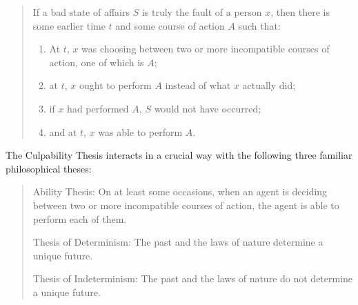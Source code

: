 \vspace{-1em}

\begin{quote}
If a bad state of affairs $S$ is truly the fault of a person $x$, then there
is some earlier time $t$ and some course of action $A$ such that: 
\begin{enumerate}
\def\labelenumi{(\arabic{enumi})}
\setcounter{enumi}{0}
\item
  At $t$, $x$ was choosing between two or more incompatible courses of action, one
of which is $A$; 
\item 
  at $t$, $x$ ought to perform $A$ instead of what $x$ actually
did;
\item 
    if $x$ had performed $A$, $S$ would not have occurred;
\item 
    and at $t$, $x$ was able to perform $A$.

    
\end{enumerate}

\end{quote}


\noindent The Culpability Thesis interacts in a crucial way with the following
three familiar philosophical theses:

\vspace{-1em}
\begin{quote}
Ability Thesis: On at least some occasions, when an agent is deciding
between two or more incompatible courses of action, the agent is able to
perform each of them.

Thesis of Determinism: The past and the laws of nature determine a
unique future.

Thesis of Indeterminism: The past and the laws of nature do not
determine a unique future.
\end{quote}

